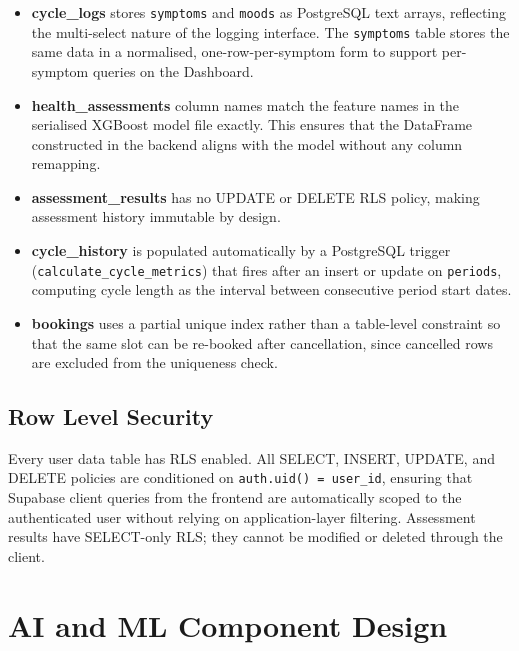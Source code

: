 \begin{itemize}
    \item \textbf{cycle\_logs} stores \texttt{symptoms} and \texttt{moods} as PostgreSQL text arrays, reflecting the multi-select nature of the logging interface. The \texttt{symptoms} table stores the same data in a normalised, one-row-per-symptom form to support per-symptom queries on the Dashboard.

    \item \textbf{health\_assessments} column names match the feature names in the serialised XGBoost model file exactly. This ensures that the DataFrame constructed in the backend aligns with the model without any column remapping.

    \item \textbf{assessment\_results} has no UPDATE or DELETE RLS policy, making assessment history immutable by design.

    \item \textbf{cycle\_history} is populated automatically by a PostgreSQL trigger (\texttt{calculate\_cycle\_metrics}) that fires after an insert or update on \texttt{periods}, computing cycle length as the interval between consecutive period start dates.

    \item \textbf{bookings} uses a partial unique index rather than a table-level constraint so that the same slot can be re-booked after cancellation, since cancelled rows are excluded from the uniqueness check.
\end{itemize}

\subsection{Row Level Security}
\label{subsec:rls}

Every user data table has RLS enabled. All SELECT, INSERT, UPDATE, and DELETE policies are conditioned on \texttt{auth.uid() = user\_id}, ensuring that Supabase client queries from the frontend are automatically scoped to the authenticated user without relying on application-layer filtering. Assessment results have SELECT-only RLS; they cannot be modified or deleted through the client.

\section{AI and ML Component Design}
\label{sec:ai-design}

